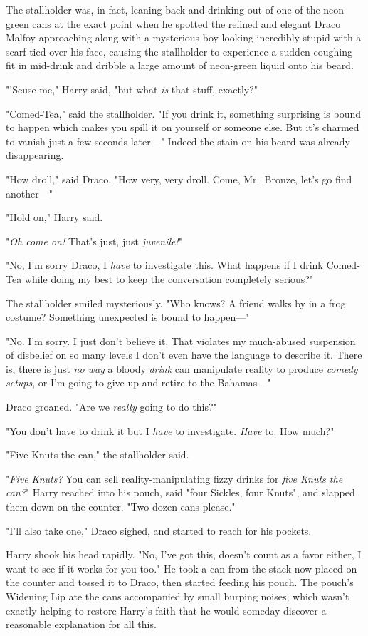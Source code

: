 The stallholder was, in fact, leaning back and drinking out of one of the 
neon-green cans at the exact point when he spotted the refined and elegant 
Draco Malfoy approaching along with a mysterious boy looking incredibly stupid 
with a scarf tied over his face, causing the stallholder to experience a sudden 
coughing fit in mid-drink and dribble a large amount of neon-green liquid onto 
his beard.

"'Scuse me," Harry said, "but what \emph{is} that stuff, exactly?"

"Comed-Tea," said the stallholder. "If you drink it, something surprising is 
bound to happen which makes you spill it on yourself or someone else. But it's 
charmed to vanish just a few seconds later---" Indeed the stain on his beard 
was already disappearing.

"How droll," said Draco. "How very, very droll. Come, Mr.~Bronze, let's go find 
another---"

"Hold on," Harry said.

"\emph{Oh come on!} That's just, just \emph{juvenile!}"

"No, I'm sorry Draco, I \emph{have} to investigate this. What happens if I 
drink Comed-Tea while doing my best to keep the conversation completely 
serious?"

The stallholder smiled mysteriously. "Who knows? A friend walks by in a frog 
costume? Something unexpected is bound to happen---"

"No. I'm sorry. I just don't believe it. That violates my much-abused 
suspension of disbelief on so many levels I don't even have the language to 
describe it. There is, there is just \emph{no way} a bloody \emph{drink} can 
manipulate reality to produce \emph{comedy setups}, or I'm going to give up and 
retire to the Bahamas---"

Draco groaned. "Are we \emph{really} going to do this?"

"You don't have to drink it but I \emph{have} to investigate. \emph{Have} to. 
How much?"

"Five Knuts the can," the stallholder said.

"\emph{Five Knuts?} You can sell reality-manipulating fizzy drinks for 
\emph{five Knuts the can?}" Harry reached into his pouch, said "four Sickles, 
four Knuts", and slapped them down on the counter. "Two dozen cans please."

"I'll also take one," Draco sighed, and started to reach for his pockets.

Harry shook his head rapidly. "No, I've got this, doesn't count as a favor 
either, I want to see if it works for you too." He took a can from the stack 
now placed on the counter and tossed it to Draco, then started feeding his 
pouch. The pouch's Widening Lip ate the cans accompanied by small burping 
noises, which wasn't exactly helping to restore Harry's faith that he would 
someday discover a reasonable explanation for all this.

